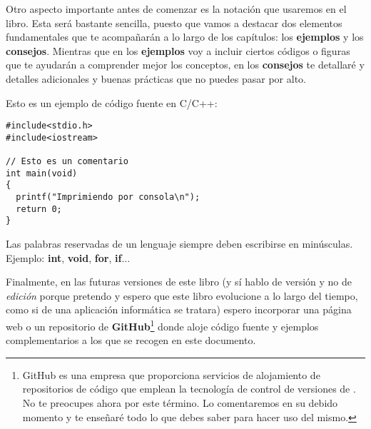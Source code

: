 Otro aspecto importante antes de comenzar es la notación que usaremos en el libro. Esta será bastante sencilla, puesto que vamos
a destacar dos elementos fundamentales que te acompañarán a lo largo de los capítulos: los \textbf{ejemplos} y los \textbf{consejos}. Mientras que
en los \textbf{ejemplos} voy a incluir ciertos códigos o figuras que te ayudarán a comprender mejor los conceptos, en los \textbf{consejos} te detallaré
y detalles adicionales y buenas prácticas que no puedes pasar por alto.

\begin{ejemplo}
Esto es un ejemplo de código fuente en C/C++:
\begin{lstlisting}
#include<stdio.h>
#include<iostream>
    
// Esto es un comentario
int main(void)
{
  printf("Imprimiendo por consola\n");
  return 0;
}
\end{lstlisting}
\end{ejemplo}

\begin{consejo}
Las palabras reservadas de un lenguaje siempre deben escribirse en minúsculas. Ejemplo: \textbf{int}, \textbf{void}, \textbf{for}, \textbf{if}...
\end{consejo}

Finalmente, en las futuras versiones de este libro (y sí hablo de versión y no de \textit{edición} porque pretendo y espero que 
este libro evolucione a lo largo del tiempo, como si de una aplicación informática se tratara) espero incorporar una página web
o un repositorio de \textbf{GitHub}\footnote{GitHub es una empresa que proporciona servicios de alojamiento de repositorios de 
código que emplean la tecnología de control de versiones de . No te preocupes ahora por este término. Lo comentaremos
en su debido momento y te enseñaré todo lo que debes saber para hacer uso del mismo.} donde aloje código fuente y 
ejemplos complementarios a los que se recogen en este documento.
